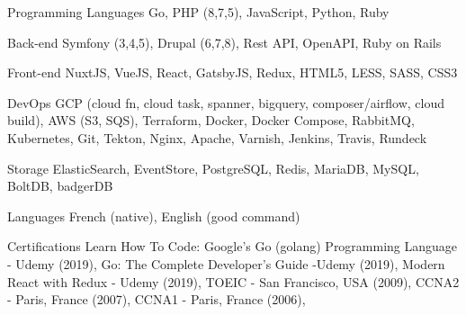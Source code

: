 

\begin{cvskills}

  \cvskill
    {Programming Languages} %
    {Go, PHP (8,7,5), JavaScript, Python, Ruby} %

  \cvskill
    {Back-end} %
    {Symfony (3,4,5), Drupal (6,7,8), Rest API, OpenAPI, Ruby on Rails} %

  \cvskill
    {Front-end} %
    {NuxtJS, VueJS, React, GatsbyJS, Redux, HTML5, LESS, SASS, CSS3} %

  \cvskill
    {DevOps} %
    {GCP (cloud fn, cloud task, spanner, bigquery, composer/airflow, cloud build), AWS (S3, SQS), Terraform, Docker, Docker Compose, RabbitMQ, Kubernetes, Git, Tekton, Nginx, Apache, Varnish, Jenkins, Travis, Rundeck} %

  \cvskill
    {Storage} %
    {ElasticSearch, EventStore, PostgreSQL, Redis, MariaDB, MySQL, BoltDB, badgerDB} %

  \cvskill
    {Languages} %
    {French (native), English (good command)} %

  \cvskill
  {Certifications} %
  {
  Learn How To Code: Google’s Go (golang) Programming Language - Udemy (2019),
  Go: The Complete Developer’s Guide -Udemy (2019),
  Modern React with Redux - Udemy (2019),
  TOEIC - San Francisco, USA (2009),
  CCNA2 - Paris, France (2007),
  CCNA1 - Paris, France (2006),
  } %

\end{cvskills}
